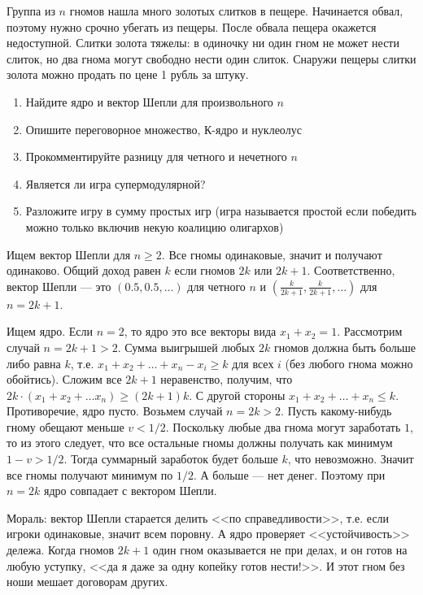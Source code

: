 \begin{problem}
 Группа из $n$ гномов нашла много золотых слитков в пещере. Начинается обвал, поэтому нужно срочно убегать из пещеры. После обвала пещера окажется недоступной. Слитки золота тяжелы: в одиночку ни один гном не может нести слиток, но два гнома могут свободно нести один слиток. Снаружи пещеры слитки золота можно продать по цене 1 рубль за штуку.
\begin{enumerate}
\item Найдите ядро и вектор Шепли для произвольного $n$
\item Опишите переговорное множество, К-ядро и нуклеолус
\item Прокомментируйте разницу для четного и нечетного $n$
\item Является ли игра супермодулярной?
\item Разложите игру в сумму простых игр (игра называется простой если победить можно только включив некую коалицию олигархов)
\end{enumerate}




\begin{sol}
Ищем вектор Шепли для $n\geq 2$. Все гномы одинаковые, значит и получают одинаково. Общий доход равен $k$ если гномов $2k$ или $2k+1$. Соответственно, вектор Шепли --- это $(0.5,0.5,\ldots )$ для четного $n$ и $(\frac{k}{2k+1},\frac{k}{2k+1},\ldots )$ для $n=2k+1$.

Ищем ядро. Если $n=2$, то ядро это все векторы вида $x_{1}+x_{2}=1$. Рассмотрим случай $n=2k+1>2$. Сумма выигрышей любых $2k$ гномов должна быть больше либо равна $k$, т.е. $x_{1}+x_{2}+\ldots +x_{n}-x_{i}\geq k$ для всех $i$ (без любого гнома можно обойтись). Сложим все $2k+1$ неравенство, получим, что $2k\cdot (x_{1}+x_{2}+\ldots x_{n})\geq (2k+1)k$. С другой стороны $x_{1}+x_{2}+\ldots +x_{n}\leq k$. Противоречие, ядро пусто. Возьмем случай $n=2k>2$. Пусть какому-нибудь гному обещают меньше $v<1/2$. Поскольку любые два гнома могут заработать $1$, то из этого следует, что все остальные гномы должны получать как минимум $1-v>1/2$. Тогда суммарный заработок будет больше $k$, что невозможно. Значит все гномы получают минимум по $1/2$. А больше  --- нет денег. Поэтому при $n=2k$ ядро совпадает с вектором Шепли.

Мораль: вектор Шепли старается делить <<по справедливости>>, т.е. если игроки одинаковые, значит всем поровну. А ядро проверяет <<устойчивость>> дележа. Когда гномов $2k+1$ один гном оказывается не при делах, и он готов на любую уступку, <<да я даже за одну копейку готов нести!>>. И этот гном без ноши мешает договорам других.
\end{sol}
\end{problem}


